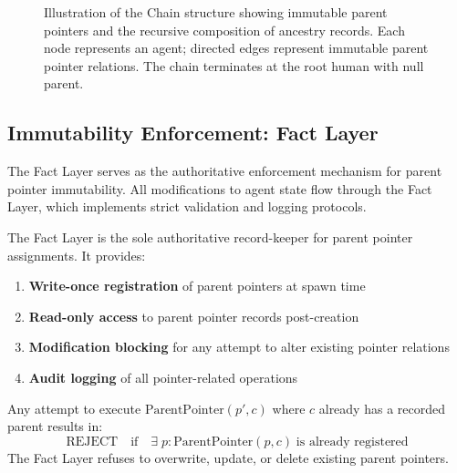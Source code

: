 \begin{figure}[htbp]
\centering
{}
\caption{Illustration of the Chain structure showing immutable parent pointers and the recursive composition of ancestry records. Each node represents an agent; directed edges represent immutable parent pointer relations. The chain terminates at the root human with null parent.}
\label{fig:chain-structure}
\end{figure}

\subsection{Immutability Enforcement: Fact Layer}

The Fact Layer serves as the authoritative enforcement mechanism for parent pointer immutability. All modifications to agent state flow through the Fact Layer, which implements strict validation and logging protocols.

\begin{definition}
The Fact Layer is the sole authoritative record-keeper for parent pointer assignments. It provides:
\begin{enumerate}
    \item \textbf{Write-once registration} of parent pointers at spawn time
    \item \textbf{Read-only access} to parent pointer records post-creation
    \item \textbf{Modification blocking} for any attempt to alter existing pointer relations
    \item \textbf{Audit logging} of all pointer-related operations
\end{enumerate}
\end{definition}

\begin{invariant}
Any attempt to execute $\text{ParentPointer}(p', c)$ where $c$ already has a recorded parent results in:
\[
\text{REJECT} \quad \text{if} \quad \exists\; p: \text{ParentPointer}(p, c) \;\text{is already registered}
\]
The Fact Layer refuses to overwrite, update, or delete existing parent pointers.
\end{invariant}

